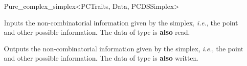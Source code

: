 \begin{ccRefClass}{Pure_complex_simplex<PCTraits, Data, PCDSSimplex>}
\ccGlue{}


%
{Inputs the non-combinatorial information given by the simplex, \emph{i.e.},
the point and other possible information. The data of type  is
\textbf{also} read.}

%
{Outputs the non-combinatorial information given by the simplex, \emph{i.e.},
the point and other possible information. The data of type  is
\textbf{also} written.}

\ccSeeAlso


\end{ccRefClass}
